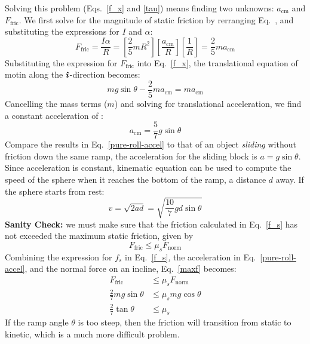 Solving this problem (Eqs.~\ref{f_x} and \ref{tau}) means finding two unknowns:
$a_\text{cm}$ and $F_\text{fric}$. We first solve for the magnitude of static
friction by rerranging Eq.~\label{tau}, and substituting the expressions for
$I$ and $\alpha$:
\begin{equation}
  F_\text{fric}=\frac{I\alpha}R=
  \left[\frac25 mR^2\right]
  \left[\frac{a_\text{cm}}R\right]
  \left[\frac1R\right]=\frac25ma_\text{cm}
  \label{f_s}
\end{equation}
Substituting the expression for $F_\text{fric}$
into Eq.~\ref{f_x}, the translational equation of motin along the
$\bm{\hat\imath}$-direction becomes:
\begin{equation}
  mg\sin\theta-\frac25 ma_\text{cm}=ma_\text{cm}
\end{equation}
Cancelling the mass terms ($m$) and solving for translational acceleration, we
find a constant acceleration of :
\begin{equation}
  a_\text{cm}=\frac57 g\sin\theta
  \label{pure-roll-accel}
\end{equation}
Compare the results in Eq.~\ref{pure-roll-accel} to that of an object
\emph{sliding} without friction down the same ramp, the acceleration for the
sliding block is $a=g\sin\theta$.
Since acceleration is constant, kinematic equation can be used to compute the
speed of the sphere when it reaches the bottom of the ramp, a distance $d$ away.
If the sphere starts from rest:
\begin{equation}
  v=\sqrt{2ad}=\sqrt{\frac{10}7gd\sin\theta}
\end{equation}
\textbf{Sanity Check:} we must make sure that the friction calculated in
Eq.~\ref{f_s} has not exceeded the maximum static friction, given by
\begin{equation}
  F_\text{fric}\leq\mu_sF_\text{norm}
  \label{maxf}
\end{equation}
Combining the expression for $f_s$ in Eq.~\ref{f_s}, the acceleration in
Eq.~\ref{pure-roll-accel}, and the normal force on an incline, Eq.~\ref{maxf}
becomes:
\begin{align}
  F_\text{fric}&\leq\mu_sF_\text{norm}\nonumber\\
  \frac27mg\sin\theta&\leq\mu_smg\cos\theta\nonumber\\
  \frac27\tan\theta&\leq\mu_s
\end{align}
If the ramp angle $\theta$ is too steep, then the friction will transition from
static to kinetic, which is a much more difficult problem.

